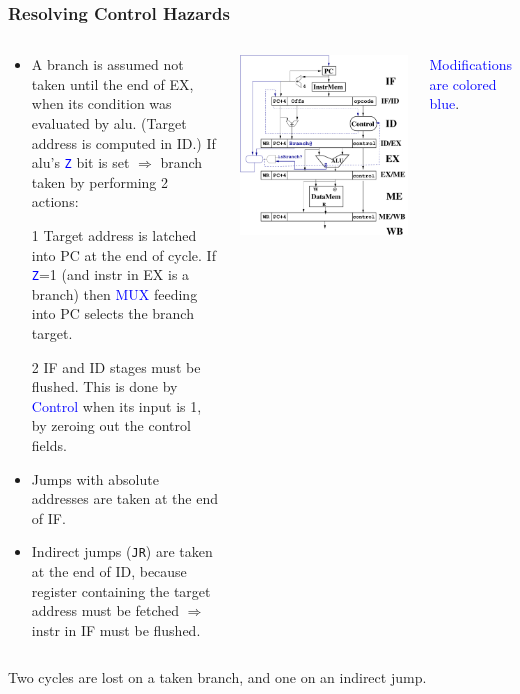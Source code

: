 \documentclass{beamer}
\newcommand{\blue}[1]{\textcolor{Blue}{{#1}}}
\newcommand{\emp}[1]{\textcolor{DikuRed}{ #1}}
\begin{document}
\begin{frame}[fragile,t]
\frametitle{Resolving Control Hazards}

\begin{columns}
\begin{scriptsize}
\begin{itemize}
\item \emp{A branch} is assumed not taken until the end of EX, 
        when its condition was evaluated by {\sc alu}.
        (Target address is computed in ID.) If {\sc alu}'s 
        \blue{\tt Z} bit is set $\Rightarrow$ branch taken by 
        performing 2 actions:
\item[1] Target address is latched into PC at the end of cycle.
        If \blue{\tt Z}=1 (and instr in EX is a branch) then 
        \blue{MUX} feeding into PC selects the branch target.
\item[2] IF and ID stages must be flushed.  This is done by
            \blue{Control} when its input is 1, by zeroing out
            the control fields.
\item \emp{Jumps with absolute addresses} are taken at the end of IF.
\item \emp{Indirect jumps} ({\tt JR}) are taken at the end of ID,
         because register containing the target address must
        be fetched $\Rightarrow$ instr in IF must be flushed.

\end{itemize}
\end{scriptsize}
\vspace{-2ex}
\includegraphics[width=37ex]{Figures/ClassicPipelineCF}

\blue{Modifications are colored blue}.
\end{columns}

\bigskip

\emp{Two cycles are lost on a taken branch, and one on an indirect jump.}

\end{frame}
\end{document}
